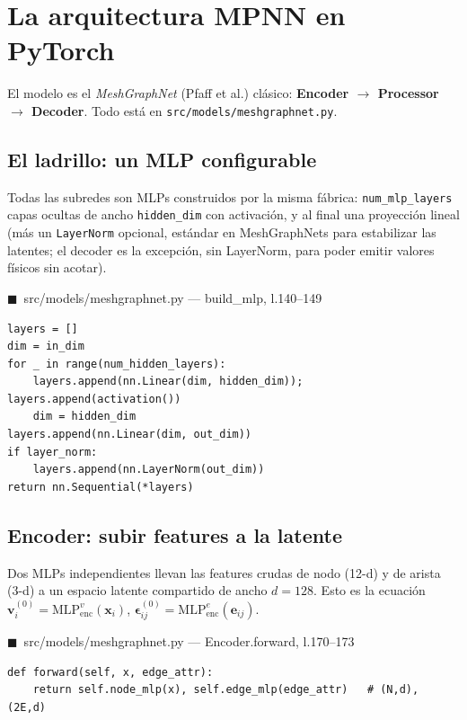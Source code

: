 \documentclass[11pt]{article}
\theoremstyle{definition}
\theoremstyle{plain}
\newcommand{\srcref}[1]{\par\smallskip\noindent
  {\footnotesize\ttfamily\textcolor{srcblue}{$\blacksquare$\ #1}}\par\vspace{1pt}}
\begin{document}
\section{La arquitectura MPNN en PyTorch}
\label{sec:mpnn}

El modelo es el \emph{MeshGraphNet} (Pfaff et al.) clásico:
\textbf{Encoder $\rightarrow$ Processor $\rightarrow$ Decoder}. Todo está en
\texttt{src/models/meshgraphnet.py}.

\subsection{El ladrillo: un MLP configurable}

Todas las subredes son MLPs construidos por la misma fábrica: \texttt{num\_mlp\_layers}
capas ocultas de ancho \texttt{hidden\_dim} con activación, y al final una proyección
lineal (más un \texttt{LayerNorm} opcional, estándar en MeshGraphNets para estabilizar
las latentes; el decoder es la excepción, sin LayerNorm, para poder emitir valores
físicos sin acotar).

\srcref{src/models/meshgraphnet.py — build\_mlp, l.140--149}
\begin{lstlisting}
layers = []
dim = in_dim
for _ in range(num_hidden_layers):
    layers.append(nn.Linear(dim, hidden_dim)); layers.append(activation())
    dim = hidden_dim
layers.append(nn.Linear(dim, out_dim))
if layer_norm:
    layers.append(nn.LayerNorm(out_dim))
return nn.Sequential(*layers)
\end{lstlisting}

\subsection{Encoder: subir features a la latente}

Dos MLPs independientes llevan las features crudas de nodo (12-d) y de arista (3-d)
a un espacio latente compartido de ancho $d=128$. Esto es la ecuación
$\bm v_i^{(0)}=\mathrm{MLP}_{\mathrm{enc}}^{v}(\bm x_i)$,
$\bm\epsilon_{ij}^{(0)}=\mathrm{MLP}_{\mathrm{enc}}^{e}(\bm e_{ij})$.

\srcref{src/models/meshgraphnet.py — Encoder.forward, l.170--173}
\begin{lstlisting}
def forward(self, x, edge_attr):
    return self.node_mlp(x), self.edge_mlp(edge_attr)   # (N,d), (2E,d)
\end{lstlisting}
\end{document}
